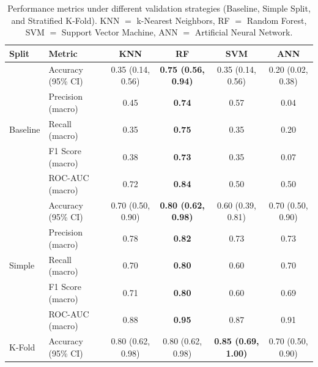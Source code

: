 \begin{table}[H]
	\centering
	\caption{Performance metrics under different validation strategies (Baseline, Simple
		Split, and Stratified K-Fold). KNN $=$ k-Nearest Neighbors, RF $=$ Random
		Forest, SVM $=$ Support Vector Machine, ANN $=$ Artificial Neural Network.}
	\label{tab:tab3}
	\begin{adjustbox}{max width=0.99\textwidth}
		\begin{tabular}{llcccc}
			\toprule
			\textbf{Split} & \textbf{Metric}    & \textbf{KNN}      & \textbf{RF}                & \textbf{SVM}               & \textbf{ANN}      \\
			\midrule
			\multirow{5}{*}{Baseline}
			               & Accuracy (95\% CI) & 0.35 (0.14, 0.56) & \textbf{0.75 (0.56, 0.94)} & 0.35 (0.14, 0.56)          & 0.20 (0.02, 0.38) \\
			               & Precision (macro)  & 0.45              & \textbf{0.74}              & 0.57                       & 0.04              \\
			               & Recall (macro)     & 0.35              & \textbf{0.75}              & 0.35                       & 0.20              \\
			               & F1 Score (macro)   & 0.38              & \textbf{0.73}              & 0.35                       & 0.07              \\
			               & ROC-AUC (macro)    & 0.72              & \textbf{0.84}              & 0.50                       & 0.50              \\
			\midrule
			\multirow{5}{*}{Simple}
			               & Accuracy (95\% CI) & 0.70 (0.50, 0.90) & \textbf{0.80 (0.62, 0.98)} & 0.60 (0.39, 0.81)          & 0.70 (0.50, 0.90) \\
			               & Precision (macro)  & 0.78              & \textbf{0.82}              & 0.73                       & 0.73              \\
			               & Recall (macro)     & 0.70              & \textbf{0.80}              & 0.60                       & 0.70              \\
			               & F1 Score (macro)   & 0.71              & \textbf{0.80}              & 0.60                       & 0.69              \\
			               & ROC-AUC (macro)    & 0.88              & \textbf{0.95}              & 0.87                       & 0.91              \\
			\midrule
			\multirow{5}{*}{K-Fold}
			               & Accuracy (95\% CI) & 0.80 (0.62, 0.98) & 0.80 (0.62, 0.98)          & \textbf{0.85 (0.69, 1.00)} & 0.70 (0.50, 0.90) \\

\end{tabular}
\end{adjustbox}
\end{table}
